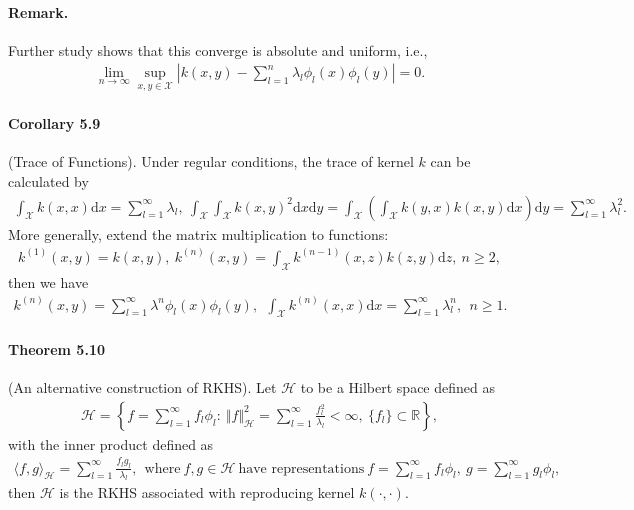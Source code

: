 \documentclass{article}
\begin{document}
\paragraph{Remark.} Further study shows that this converge is absolute and uniform, i.e.,
\begin{align*}
	\lim_{n\to\infty}\sup_{x,y\in\mathcal{X}}\left\vert k(x,y) - \sum_{l=1}^n\lambda_l\phi_l(x)\phi_l(y)\right\vert = 0.\tag{5.24}\label{eq:5.24}
\end{align*}

\paragraph{Corollary 5.9} (Trace of Functions). Under regular conditions, the trace of kernel $k$ can be calculated by
\begin{align*}
	\int_\mathcal{X} k(x,x)\mathrm{d}x = \sum_{l=1}^\infty \lambda_l,\ \int_\mathcal{X}\int_\mathcal{X} k(x,y)^2\mathrm{d}x\mathrm{d}y = \int_\mathcal{X}\left(\int_\mathcal{X} k(y,x)k(x,y)\mathrm{d}x\right)\mathrm{d}y = \sum_{l=1}^\infty \lambda_l^2.\tag{5.25}
\end{align*}
More generally, extend the matrix multiplication to functions:
\begin{align*}
	k^{(1)}(x,y)=k(x,y),\ k^{(n)}(x,y) = \int_\mathcal{X}k^{(n-1)}(x,z)k(z,y)\mathrm{d}z,\ n \geq 2,\tag{5.26}
\end{align*}
then we have
\begin{align*}
	k^{(n)}(x,y) = \sum_{l=1}^\infty\lambda^n\phi_l(x)\phi_l(y),\ \ \int_\mathcal{X}k^{(n)}(x,x)\mathrm{d}x = \sum_{l=1}^\infty\lambda_l^n,\ \ n\geq 1.\tag{5.27}
\end{align*}

\paragraph{Theorem 5.10} (An alternative construction of RKHS). Let $\mathcal{H}$ to be a Hilbert space defined as
\begin{align*}
	\mathcal{H}=\left\lbrace f=\sum_{l=1}^\infty f_l\phi_l:\ \Vert f\Vert_\mathcal{H}^2 = \sum_{l=1}^\infty\frac{f_l^2}{\lambda_l}<\infty,\ \lbrace f_l\rbrace \subset\mathbb{R}\right\rbrace,\tag{5.28}
\end{align*}
with the inner product defined as
\begin{align*}
	\langle f,g\rangle_\mathcal{H} = \sum_{l=1}^\infty \frac{f_l g_l}{\lambda_l},\ \ \text{where}\ f,g\in\mathcal{H}\ \text{have representations}\ f=\sum_{l=1}^\infty f_l\phi_l,\ g=\sum_{l=1}^\infty g_l\phi_l,\tag{5.29}
\end{align*}
then $\mathcal{H}$ is the RKHS associated with reproducing kernel $k(\cdot,\cdot)$.
\end{document}
